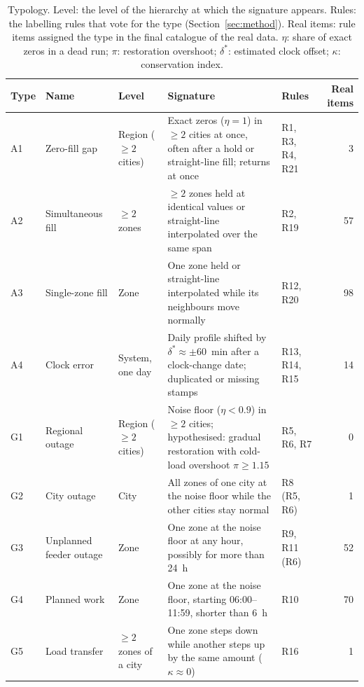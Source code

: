 \begin{table}[htbp]
\centering
\caption{Typology. Level: the level of the hierarchy at which the signature appears. Rules: the labelling rules that vote for the type (Section~\ref{sec:method}). Real items: rule items assigned the type in the final catalogue of the real data. $\eta$: share of exact zeros in a dead run; $\pi$: restoration overshoot; $\delta^*$: estimated clock offset; $\kappa$: conservation index.}
\label{tab:typology}
\footnotesize
\setlength{\tabcolsep}{4pt}
\begin{tabularx}{\textwidth}{@{}l L{2.1cm} L{1.9cm} Y L{1.6cm} r@{}}
\toprule
Type & Name & Level & Signature & Rules & Real items \\
\midrule
A1 & Zero-fill gap & Region ($\geq 2$ cities) & Exact zeros ($\eta = 1$) in $\geq 2$ cities at once, often after a hold or straight-line fill; returns at once & R1, R3, R4, R21 & 3 \\
A2 & Simultaneous fill & $\geq 2$ zones & $\geq 2$ zones held at identical values or straight-line interpolated over the same span & R2, R19 & 57 \\
A3 & Single-zone fill & Zone & One zone held or straight-line interpolated while its neighbours move normally & R12, R20 & 98 \\
A4 & Clock error & System, one day & Daily profile shifted by $\delta^* \approx \pm 60$~min after a clock-change date; duplicated or missing stamps & R13, R14, R15 & 14 \\
\midrule
G1 & Regional outage & Region ($\geq 2$ cities) & Noise floor ($\eta < 0.9$) in $\geq 2$ cities; hypothesised: gradual restoration with cold-load overshoot $\pi \geq 1.15$ & R5, R6, R7 & 0 \\
G2 & City outage & City & All zones of one city at the noise floor while the other cities stay normal & R8 (R5, R6) & 1 \\
G3 & Unplanned feeder outage & Zone & One zone at the noise floor at any hour, possibly for more than 24~h & R9, R11 (R6) & 52 \\
G4 & Planned work & Zone & One zone at the noise floor, starting 06:00--11:59, shorter than 6~h & R10 & 70 \\
G5 & Load transfer & $\geq 2$ zones of a city & One zone steps down while another steps up by the same amount ($\kappa \approx 0$) & R16 & 1 \\
\bottomrule
\end{tabularx}
\end{table}

